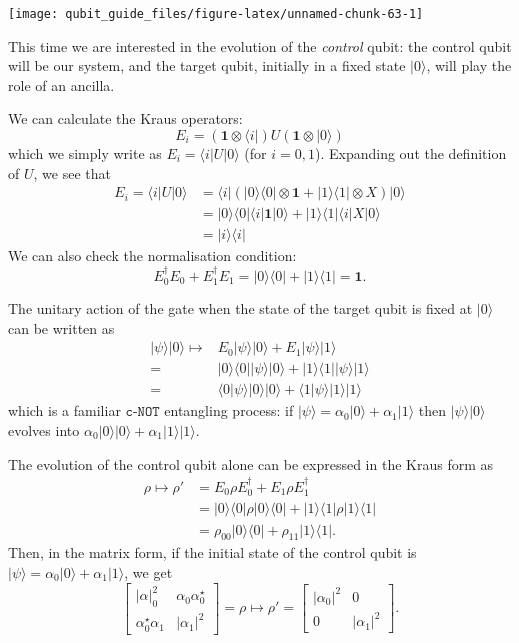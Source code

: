 \documentclass[fleqn]{article}
\begin{document}
\begin{center}\texttt{[image: qubit\_guide\_files/figure-latex/unnamed-chunk-63-1]} \end{center}

This time we are interested in the evolution of the \emph{control} qubit: the control qubit will be our system, and the target qubit, initially in a fixed state \(|0\rangle\), will play the role of an ancilla.

We can calculate the Kraus operators:
\[
  E_i = (\mathbf{1}\otimes\langle i|) U (\mathbf{1}\otimes|0\rangle)
\]
which we simply write as \(E_i=\langle i|U|0\rangle\) (for \(i=0,1\)).
Expanding out the definition of \(U\), we see that
\[
  \begin{aligned}
    E_i = \langle i|U|0\rangle
    &= \langle i| (|0\rangle\langle 0|\otimes\mathbf{1}+ |1\rangle\langle 1|\otimes X) |0\rangle
  \\&= |0\rangle\langle 0|\langle i|\mathbf{1}|0\rangle + |1\rangle\langle 1|\langle i|X|0\rangle
  \\&= |i\rangle\langle i|
\end{aligned}
\]
We can also check the normalisation condition:
\[
  E_0^\dagger E_0 + E_1^\dagger E_1
  = |0\rangle\langle 0| + |1\rangle\langle 1|
  =\mathbf{1}.
\]

The unitary action of the gate when the state of the target qubit is fixed at \(|0\rangle\) can be written as
\[
  \begin{aligned}
    |\psi\rangle|0\rangle
    \longmapsto
    & E_0|\psi\rangle|0\rangle + E_1|\psi\rangle|1\rangle
  \\=& |0\rangle\langle 0||\psi\rangle|0\rangle + |1\rangle\langle 1||\psi\rangle|1\rangle
  \\=& \langle 0|\psi\rangle|0\rangle|0\rangle + \langle 1|\psi\rangle|1\rangle|1\rangle
  \end{aligned}
\]
which is a familiar \(\texttt{c-NOT}\) entangling process: if \(|\psi\rangle=\alpha_0|0\rangle+\alpha_1|1\rangle\) then \(|\psi\rangle|0\rangle\) evolves into \(\alpha_0|0\rangle|0\rangle+\alpha_1|1\rangle|1\rangle\).

The evolution of the control qubit alone can be expressed in the Kraus form as
\[
  \begin{aligned}
    \rho \longmapsto \rho'
    &= E_0\rho E_0^\dagger + E_1\rho E_1^\dagger
  \\&= |0\rangle\langle 0|\rho|0\rangle\langle 0| + |1\rangle\langle 1|\rho|1\rangle\langle 1|
  \\&= \rho_{00}|0\rangle\langle 0| + \rho_{11}|1\rangle\langle 1|.
  \end{aligned}
\]
Then, in the matrix form, if the initial state of the control qubit is \(|\psi\rangle=\alpha_0|0\rangle+\alpha_1|1\rangle\), we get
\[
  \begin{bmatrix}
    |\alpha|_0^2 & \alpha_0\alpha_0^\star
  \\\alpha_0^\star\alpha_1 & |\alpha_1|^2
  \end{bmatrix}
  = \rho
  \longmapsto
  \rho' =
  \begin{bmatrix}
    |\alpha_0|^2 & 0
  \\0 & |\alpha_1|^2
  \end{bmatrix}.
\]
\end{document}
